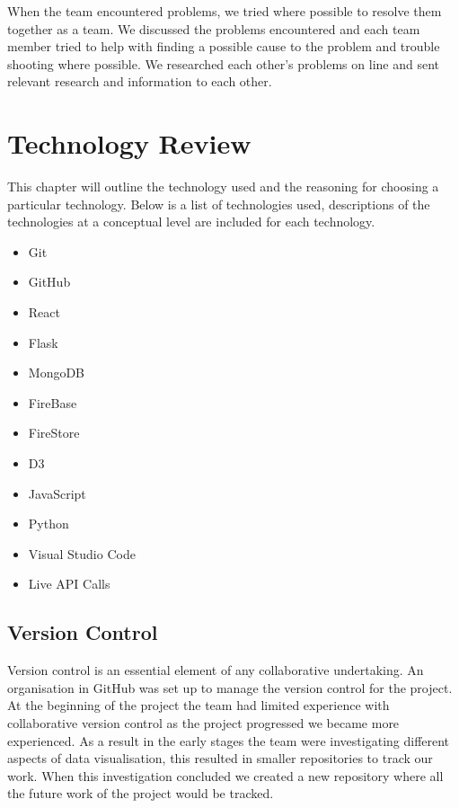 \vspace{5mm}
When the team encountered problems, we tried where possible to resolve them together as a team. We discussed the problems encountered and each team member tried to help with finding a possible cause to the problem and trouble shooting where possible. We researched each other's problems on line and sent relevant research and information to each other.

\vspace{5mm} %


\chapter{Technology Review}
This chapter will outline the technology used and the reasoning for choosing a particular technology. Below is a list of technologies used, descriptions of the technologies at a conceptual level are included for each technology.
\begin{itemize}
\item Git
\item GitHub
\item React
\item Flask
\item MongoDB
\item FireBase
\item FireStore
\item D3
\item JavaScript
\item Python
\item Visual Studio Code
\item Live API Calls

\end{itemize}

\section{Version Control}
Version control is an essential element of any collaborative undertaking. An organisation in GitHub was set up to manage the version control for the project. At the beginning of the project the team had limited experience with collaborative version control as the project progressed we became more experienced. As a result in the early stages the team were investigating different aspects of data visualisation, this resulted in  smaller repositories to track our work.  When this investigation concluded we created a new repository where all the future work of the project would be tracked. 
